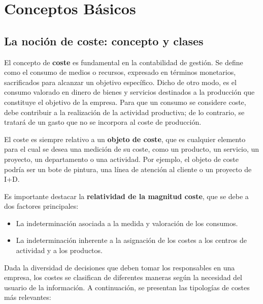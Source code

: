 

\chapter{Conceptos Básicos}

\section{La noción de coste: concepto y clases}

El concepto de \textbf{coste} es fundamental en la contabilidad de gestión. Se define como el consumo de medios o recursos, expresado en términos monetarios, sacrificados para alcanzar un objetivo específico. Dicho de otro modo, es el consumo valorado en dinero de bienes y servicios destinados a la producción que constituye el objetivo de la empresa. Para que un consumo se considere coste, debe contribuir a la realización de la actividad productiva; de lo contrario, se tratará de un gasto que no se incorpora al coste de producción.

El coste es siempre relativo a un \textbf{objeto de coste}, que es cualquier elemento para el cual se desea una medición de su coste, como un producto, un servicio, un proyecto, un departamento o una actividad. Por ejemplo, el objeto de coste podría ser un bote de pintura, una línea de atención al cliente o un proyecto de I+D.

Es importante destacar la \textbf{relatividad de la magnitud coste}, que se debe a dos factores principales:
\begin{itemize}
    \item La indeterminación asociada a la medida y valoración de los consumos.
    \item La indeterminación inherente a la asignación de los costes a los centros de actividad y a los productos.
\end{itemize}

Dada la diversidad de decisiones que deben tomar los responsables en una empresa, los costes se clasifican de diferentes maneras según la necesidad del usuario de la información. A continuación, se presentan las tipologías de costes más relevantes:

